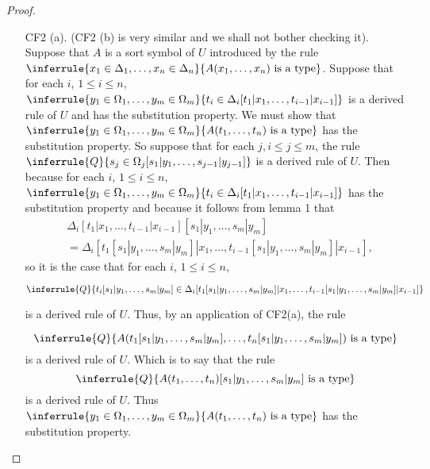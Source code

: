 \begin{proof}
\begin{enumerate}
  \item[CF2 (a).] (CF2 (b) is very similar and we shall not bother checking it).
  Suppose that $A$ is a sort symbol of $U$ introduced by the rule $\inferrule{x_1\in\Delta_1,\ldots,x_n\in\Delta_n}{A(x_1,\ldots,x_n)\isatype}$.
  Suppose that for each $i$, $1\leq i\leq n$, $\inferrule{y_1\in\Omega_1,\ldots,y_m\in\Omega_m}{t_i\in\Delta_i[t_1|x_1,\ldots,t_{i-1}|x_{i-1}]}$ is a derived rule of $U$ and has the substitution property.
  We must show that $\inferrule{y_1\in\Omega_1,\ldots,y_m\in\Omega_m}{A(t_1,\ldots,t_n)\isatype}$ has the substitution property.
  So suppose that for each $j, i\leq j\leq m$, the rule $\inferrule{Q}{s_j\in\Omega_j[s_1|y_1,\ldots,s_{j-1}|y_{j-1}]}$ is a derived rule of $U$.
  Then because for each $i$, $1\leq i\leq n$, $\inferrule{y_1\in\Omega_1,\ldots,y_m\in\Omega_m}{t_i\in\Delta_i[t_1|x_1,\ldots,t_{i-1}|x_{i-1}]}$ has the substitution property and because it follows from lemma 1 that
  \begin{align*}
    &\Delta_i[t_1|x_1,\ldots,t_{i-1}|x_{i-1}][s_1|y_1,\ldots,s_m|y_m]\\
    &=\Delta_i[t_1[s_1|y_1,\ldots,s_m|y_m]|x_1,\ldots,t_{i-1}[s_1|y_1,\ldots,s_m|y_m]|x_{i-1}],
  \end{align*}
 so it is the case that for each $i$, $1\leq i\leq n$,

  \[ \inferrule{Q}{t_i[s_1|y_1,\ldots,s_m|y_m]\in\Delta_i[t_1[s_1|y_1,\ldots,s_m|y_m]|x_1,\ldots,t_{i-1}[s_1|y_1,\ldots,s_m|y_m]|x_{i-1}]}\]

  is a derived rule of $U$.
  Thus, by an application of CF2(a), the rule

  \[ \inferrule{Q}{A(t_1[s_1|y_1,\ldots,s_m|y_m],\ldots,t_n[s_1|y_1,\ldots,s_m|y_m])\isatype}\]
  is a derived rule of $U$. Which is to say that the rule 
  \[\inferrule{Q}{A(t_1,\ldots,t_n)[s_1|y_1,\ldots,s_m|y_m]\isatype}\] is a derived rule of $U$.
  Thus $\inferrule{y_1\in\Omega_1,\ldots, y_m\in\Omega_m}{A(t_1,\ldots,t_n)\isatype}$ has the substitution property.
\end{enumerate}
\end{proof}

